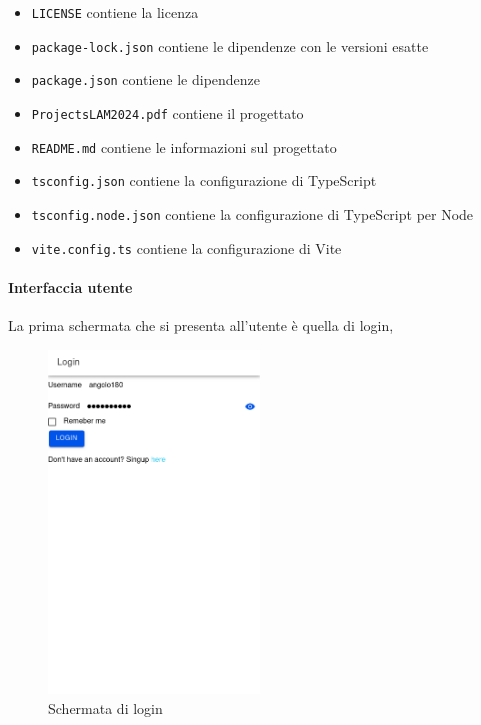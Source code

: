 \documentclass[a4paper]{article}
\begin{document}
\begin{itemize}
	\item \texttt{LICENSE} contiene la licenza
	\item \texttt{package-lock.json} contiene le dipendenze con le versioni esatte
	\item \texttt{package.json} contiene le dipendenze
	\item \texttt{ProjectsLAM2024.pdf} contiene il progettato
	\item \texttt{README.md} contiene le informazioni sul progettato
	\item \texttt{tsconfig.json} contiene la configurazione di TypeScript
	\item \texttt{tsconfig.node.json} contiene la configurazione di TypeScript per Node
	\item \texttt{vite.config.ts} contiene la configurazione di Vite
\end{itemize}

\paragraph{Interfaccia utente}



La prima schermata che si presenta all'utente è quella di login,
\begin{figure}[h]
	\centering
	\includegraphics[width=0.5\textwidth]{login.png}
	\caption{Schermata di login}
\end{figure}
\end{document}
